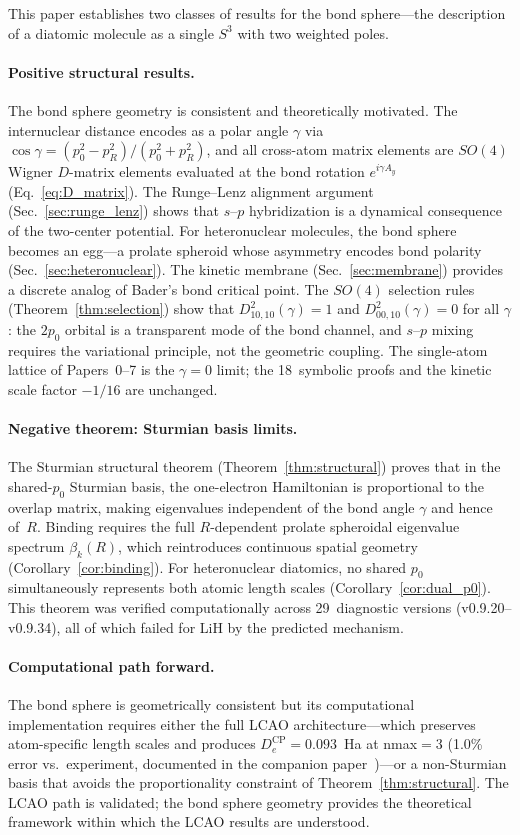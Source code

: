 \documentclass[aps,pra,twocolumn,superscriptaddress,longbibliography]{revtex4-2}
\begin{document}
This paper establishes two classes of results for the bond sphere---the
description of a diatomic molecule as a single $S^3$ with two weighted
poles.

\paragraph{Positive structural results.}
The bond sphere geometry is consistent and theoretically motivated.
The internuclear distance encodes as a polar angle $\gamma$ via
$\cos\gamma = (p_0^2 - p_R^2)/(p_0^2 + p_R^2)$, and all cross-atom
matrix elements are $SO(4)$ Wigner $D$-matrix elements evaluated at the
bond rotation $e^{i\gamma A_y}$ (Eq.~\eqref{eq:D_matrix}).  The
Runge--Lenz alignment argument (Sec.~\ref{sec:runge_lenz}) shows that
$s$--$p$ hybridization is a dynamical consequence of the two-center
potential.  For heteronuclear molecules, the bond sphere becomes an
egg---a prolate spheroid whose asymmetry encodes bond polarity
(Sec.~\ref{sec:heteronuclear}).  The kinetic membrane
(Sec.~\ref{sec:membrane}) provides a discrete analog of Bader's bond
critical point.  The $SO(4)$ selection rules
(Theorem~\ref{thm:selection}) show that $D^2_{10,10}(\gamma) = 1$ and
$D^2_{00,10}(\gamma) = 0$ for all $\gamma$: the $2p_0$ orbital is a
transparent mode of the bond channel, and $s$--$p$ mixing requires the
variational principle, not the geometric coupling.  The single-atom
lattice of Papers~0--7 is the $\gamma = 0$ limit; the 18~symbolic
proofs and the kinetic scale factor $-1/16$ are unchanged.

\paragraph{Negative theorem: Sturmian basis limits.}
The Sturmian structural theorem (Theorem~\ref{thm:structural}) proves
that in the shared-$p_0$ Sturmian basis, the one-electron Hamiltonian is
proportional to the overlap matrix, making eigenvalues independent of the
bond angle $\gamma$ and hence of~$R$.  Binding requires the full
$R$-dependent prolate spheroidal eigenvalue spectrum $\beta_k(R)$, which
reintroduces continuous spatial geometry (Corollary~\ref{cor:binding}).
For heteronuclear diatomics, no shared $p_0$ simultaneously represents
both atomic length scales (Corollary~\ref{cor:dual_p0}).  This theorem
was verified computationally across 29~diagnostic versions
(v0.9.20--v0.9.34), all of which failed for LiH by the predicted
mechanism.

\paragraph{Computational path forward.}
The bond sphere is geometrically consistent but its computational
implementation requires either the full LCAO architecture---which
preserves atom-specific length scales and produces $D_e^{\text{CP}}
= 0.093$~Ha at nmax$= 3$ (1.0\% error vs.\ experiment, documented in
the companion paper~\cite{loutey_fci})---or a non-Sturmian basis that
avoids the proportionality constraint of Theorem~\ref{thm:structural}.
The LCAO path is validated; the bond sphere geometry provides the
theoretical framework within which the LCAO results are understood.
\end{document}
